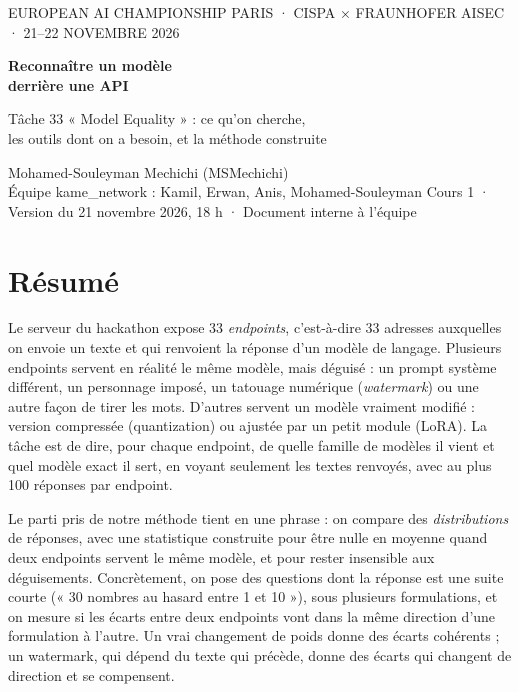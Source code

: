 \documentclass[11pt,a4paper]{report}
\theoremstyle{definition}
\theoremstyle{plain}
\begin{document}
\begin{titlepage}
\setlength{\parindent}{0pt}
\sffamily
{\small\color{bleu} EUROPEAN AI CHAMPIONSHIP PARIS · CISPA × FRAUNHOFER AISEC · 21–22 NOVEMBRE 2026}
\vspace{3cm}

{\Huge\bfseries\color{bleu} Reconnaître un modèle\\[4pt] derrière une API}
\vspace{0.6cm}

{\Large Tâche 33 « Model Equality » : ce qu'on cherche,\\ les outils dont on a besoin, et la méthode construite}
\vspace{2.5cm}

{\large Mohamed-Souleyman Mechichi (MSMechichi)}\\[2pt]
Équipe kame\_network : Kamil, Erwan, Anis, Mohamed-Souleyman
\vfill
{\small Cours 1 · Version du 21 novembre 2026, 18 h · Document interne à l'équipe}
\end{titlepage}

\chapter*{Résumé}

Le serveur du hackathon expose 33 \emph{endpoints}, c'est-à-dire 33 adresses auxquelles on envoie un texte et qui renvoient la réponse d'un modèle de langage. Plusieurs endpoints servent en réalité le même modèle, mais déguisé : un prompt système différent, un personnage imposé, un tatouage numérique (\emph{watermark}) ou une autre façon de tirer les mots. D'autres servent un modèle vraiment modifié : version compressée (quantization) ou ajustée par un petit module (LoRA). La tâche est de dire, pour chaque endpoint, de quelle famille de modèles il vient et quel modèle exact il sert, en voyant seulement les textes renvoyés, avec au plus 100 réponses par endpoint.

Le parti pris de notre méthode tient en une phrase : on compare des \emph{distributions} de réponses, avec une statistique construite pour être nulle en moyenne quand deux endpoints servent le même modèle, et pour rester insensible aux déguisements. Concrètement, on pose des questions dont la réponse est une suite courte (« 30 nombres au hasard entre 1 et 10 »), sous plusieurs formulations, et on mesure si les écarts entre deux endpoints vont dans la même direction d'une formulation à l'autre. Un vrai changement de poids donne des écarts cohérents ; un watermark, qui dépend du texte qui précède, donne des écarts qui changent de direction et se compensent.
\end{document}
